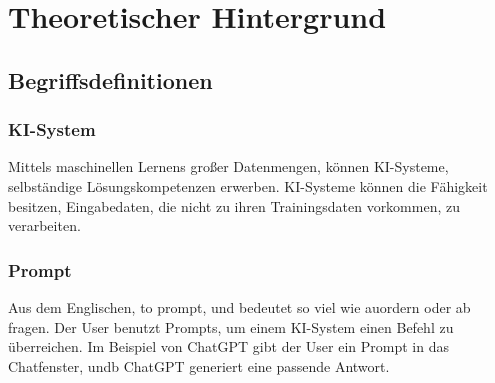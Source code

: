 \documentclass[12pt,a4paper,bibliography=totocnumbered,listof=totocnumbered]{scrartcl}
\begin{document}
\section{Theoretischer Hintergrund}
\subsection{Begriffsdefinitionen}%
\subsubsection{KI-System}
Mittels maschinellen Lernens großer Datenmengen, können KI-Systeme, selbständige Lösungskompetenzen erwerben. KI-Systeme können die Fähigkeit besitzen, Eingabedaten, die nicht zu ihren Trainingsdaten vorkommen, zu verarbeiten.
\subsubsection{Prompt}
Aus dem Englischen, to prompt, und bedeutet so viel wie auordern oder ab fragen. Der User benutzt Prompts, um einem KI-System einen Befehl zu überreichen. Im Beispiel von ChatGPT gibt der User ein Prompt in das Chatfenster, undb ChatGPT generiert eine passende Antwort.
\end{document}
